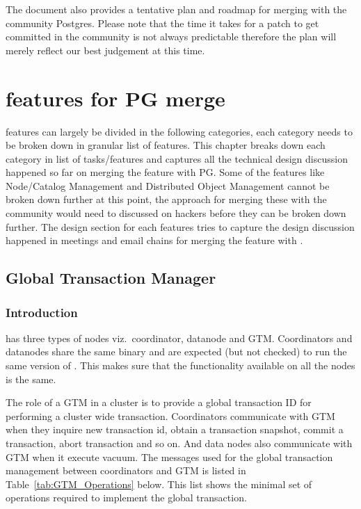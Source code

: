 	The document also provides a tentative plan and roadmap for merging \XC{} with
	the community Postgres.
	Please note that the time it takes for a patch to get committed in the community
	is not always predictable therefore the plan will merely reflect our best
	judgement at this time. 




\section{\XC{} features for PG merge}

	\XC{} features can largely be divided in the following categories,
	each category needs to be broken down in granular list of features.
	This chapter breaks down each category in list of tasks/features and
	captures all the technical design discussion happened so far on merging
	the feature with PG. Some of the features like Node/Catalog Management
	and Distributed Object Management cannot be broken down further
	at this point, the approach for merging these with the community would
	need to discussed on hackers before they can be broken down further.
	The design section for each features tries to capture the design discussion
	happened in meetings and email chains for merging the feature with \PG.



\subsection{Global Transaction Manager}



\subsubsection{Introduction}

	\XC{} has three types of nodes viz.~coordinator, datanode and GTM.
	Coordinators and datanodes share the same binary and are expected
	(but not checked) to run the same version of \XC.
	This makes sure that the functionality available on all the nodes
	is the same.

	The role of a GTM in a \XC{} cluster is to provide a global transaction
	ID for performing a cluster wide transaction.
	Coordinators communicate with GTM when they inquire new transaction id,
	obtain a transaction snapshot, commit a transaction, abort transaction
	and so on.
	And data nodes also communicate with GTM when it execute vacuum.
	The messages used for the global transaction management between coordinators
	and GTM is listed in Table~\ref{tab:GTM_Operations} below.
	This list shows the minimal set of operations required to implement the global
	transaction.

